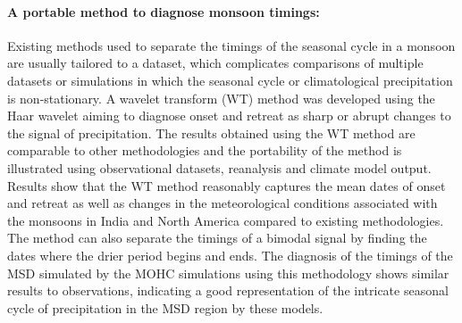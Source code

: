 \paragraph{A portable method to diagnose monsoon timings:}
Existing methods used to separate the timings of the seasonal cycle in a monsoon are usually tailored to a dataset, which complicates comparisons of multiple datasets or simulations in which the seasonal cycle or climatological precipitation is non-stationary. 
A wavelet transform (WT) method was developed using the Haar wavelet aiming to diagnose onset and retreat as sharp or abrupt changes to the signal of precipitation.
The results obtained using the WT method are comparable to other methodologies and the portability of the method is illustrated using observational datasets, reanalysis and climate model output. 
Results show that the WT method reasonably captures the mean dates of onset and retreat as well as changes in the meteorological conditions associated with the monsoons in India and North America compared to existing methodologies. 
The method can also separate the timings of a bimodal signal by finding the dates where the drier period begins and ends. 
The diagnosis of the timings of the MSD simulated by the MOHC simulations using this methodology shows similar results to observations, indicating a good representation of the intricate seasonal cycle of precipitation in the MSD region by these models.


